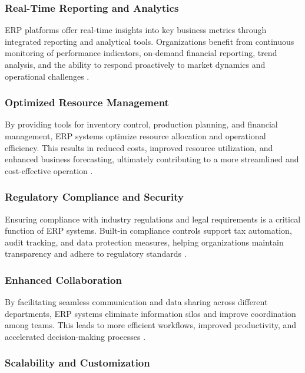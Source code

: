 \subsubsection{Real-Time Reporting and Analytics}

ERP platforms offer real-time insights into key business metrics through integrated reporting and analytical tools. Organizations benefit from continuous monitoring of performance indicators, on-demand financial reporting, trend analysis, and the ability to respond proactively to market dynamics and operational challenges \cite{sap_tm, software_connect_erp}.

\subsubsection{Optimized Resource Management}

By providing tools for inventory control, production planning, and financial management, ERP systems optimize resource allocation and operational efficiency. This results in reduced costs, improved resource utilization, and enhanced business forecasting, ultimately contributing to a more streamlined and cost-effective operation \cite{sap_evolution, appvizer_crm}.

\subsubsection{Regulatory Compliance and Security}

Ensuring compliance with industry regulations and legal requirements is a critical function of ERP systems. Built-in compliance controls support tax automation, audit tracking, and data protection measures, helping organizations maintain transparency and adhere to regulatory standards \cite{forbes_crm, vtiger_crm}.

\subsubsection{Enhanced Collaboration}

By facilitating seamless communication and data sharing across different departments, ERP systems eliminate information silos and improve coordination among teams. This leads to more efficient workflows, improved productivity, and accelerated decision-making processes \cite{medium_crm, software_suggest_erp}.

\subsubsection{Scalability and Customization}

